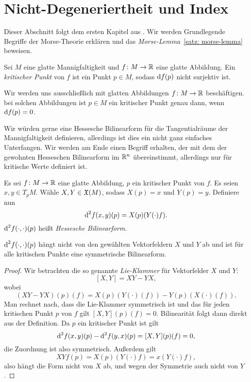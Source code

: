 \section{Nicht-Degeneriertheit und Index}

Dieser Abschnitt folgt dem ersten Kapitel aus \cite{milnor}. Wir werden Grundlegende Begriffe der
Morse-Theorie erklären und das \textit{Morse-Lemma}~\ref{satz: morse-lemma} beweisen.

\begin{definition}
    \label{def: kritischer Punkt}
    Sei $M$ eine glatte Mannigfaltigkeit und $f \colon M \to { \mathbb R }$ eine glatte Abbildung. 
    Ein \textit{kritischer Punkt} von $f$ ist ein Punkt $p \in M$, sodass ${ \operatorname{d} } f (p)$ nicht 
    surjektiv ist.
\end{definition}

\begin{remark}
    Wir werden uns ausschließlich mit glatten Abbildungen $f \colon M \to { \mathbb R }$ beschäftigen.
    bei solchen Abbildungen ist $p \in M$ ein kritischer Punkt genau dann, wenn 
    ${ \operatorname{d} } f (p) = 0$.
\end{remark}

Wir würden gerne eine Hessesche Bilinearform für die Tangentialräume der Mannigfaltigkeit
definieren, allerdings ist dies ein nicht ganz einfaches Unterfangen. Wir werden am Ende
einen Begriff erhalten, der mit dem der gewohnten Hesseschen Bilinearform im ${ \mathbb R }^n$
übereinstimmt, allerdings nur für kritische Werte definiert ist.

\begin{definition}
    Es sei $f \colon M \to { \mathbb R }$ eine glatte Abbildung, $p$ ein kritischer Punkt von $f$.
    Es seien $x, y \in T_pM$. Wähle $X, Y \in { \mathfrak{X} } (M)$, sodass $X(p) = x$ und 
    $Y(p) = y$. Definiere nun
    \[ { \operatorname{d} }^2 f (x, y) (p) = X(p)(Y(\cdot)f). \]
    ${ \operatorname{d} }^2 f (\cdot, \cdot) (p)$ heißt \textit{Hessesche Bilinearform}. 
\end{definition}

\begin{prop}
    \label{prop: hessesche ist sym bilinearform}
    ${ \operatorname{d} }^2 f (\cdot, \cdot) (p)$ hängt nicht von den gewählten Vektorfeldern $X$ und $Y$ ab 
    und ist für alle kritischen Punkte eine symmetrische Bilinearform.
\end{prop}

\begin{proof}
    Wir betrachten die so genannte \textit{Lie-Klammer} für Vektorfelder $X$ und $Y$:
    \[ [X, Y] = XY - YX , \]
    wobei
    \[ (XY - YX) (p) (f) = X(p)(Y(\cdot)(f)) - Y(p)(X(\cdot)(f)) . \]
    Man rechnet nach, dass die Lie-Klammer symmetrisch ist und das für jeden kritischen Punkt $p$
    von $f$ gilt $[X, Y](p)(f) = 0$.
    Bilinearität folgt dann direkt aus der Definition. Da $p$ ein kritischer Punkt ist gilt 
    \[ { \operatorname{d} }^2 f (x, y) (p) - { \operatorname{d} }^2 f (y, x) (p) = [X, Y] (p) (f) = 0, \]
    die Zuordnung ist also symmetrisch. Außerdem gilt
    \[ XY f (p) = X(p) (Y(\cdot) f) = x(Y(\cdot) f), \]
    also hängt die Form nicht von $X$ ab, und wegen der Symmetrie auch nicht von $Y$.
\end{proof}


